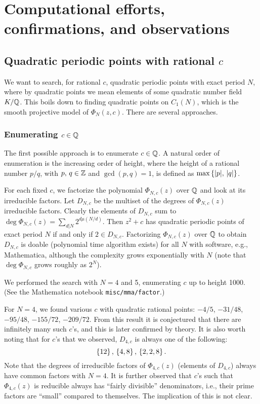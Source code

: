 \section{Computational efforts, confirmations, and observations}

\subsection{Quadratic periodic points with rational $c$}

We want to search, for rational $c$, quadratic periodic points with
exact period $N$, where by quadratic points we mean elements of
some quadratic number field $K/\mathbb{Q}$. This boils down to finding
quadratic points on $C_1(N)$, which is the smooth projective model of
$\Phi_N(z, c)$. There are several approaches.

\subsubsection{Enumerating $c \in \mathbb{Q}$}

The first possible approach is to enumerate $c \in \mathbb{Q}$. A natural
order of enumeration is the increasing order of height, where the
height of a rational number $p/q$, with $p,\, q \in \mathbb{Z}$ and $\gcd(p,
q) = 1$, is defined as $\max\left\{|p|,\, |q|\right\}$.

For each fixed $c$, we factorize the polynomial $\Phi_{N,c}(z)$ over
$\mathbb{Q}$ and look at its irreducible factors. Let $D_{N,c}$ be the
multiset of the degrees of $\Phi_{N,c}(z)$ irreducible
factors. Clearly the elements of $D_{N,c}$ sum to $\deg \Phi_{N,c}(z)
= \sum_{d|N}2^{d \mu(N/d)}$. Then $z^2 + c$ has quadratic periodic
points of exact period $N$ if and only if $2 \in D_{N,c}$. Factorizing
$\Phi_{N,c}(z)$ over $\mathbb{Q}$ to obtain $D_{N,c}$ is doable (polynomial
time algorithm exists) for all $N$ with software, e.g., Mathematica,
although the complexity grows exponentially with $N$ (note that $\deg
\Phi_{N,c}$ grows roughly as $2^N$).

We performed the search with $N = 4$ and 5, enumerating $c$ up to
height 1000. (See the Mathematica notebook \texttt{misc/mma/factor}.)

For $N = 4$, we found various $c$ with quadratic rational points:
$-4/5$, $-31/48$, $-95/48$, $-155/72$, $-209/72$. From this result it
is conjectured that there are infinitely many such $c$'s, and this is
later confirmed by theory. It is also worth noting that for $c$'s that
we observed, $D_{4,c}$ is always one of the following:
\[
\left\{12\right\},\, \left\{4, 8\right\},\, \left\{2, 2, 8\right\}.
\]
Note that the degrees of irreducible factors of $\Phi_{4,c}(z)$
(elements of $D_{4,c}$) always have common factors with $N = 4$. It is
further observed that $c$'s such that $\Phi_{4,c}(z)$ is reducible
always has ``fairly divisible'' denominators, i.e., their prime
factors are ``small'' compared to themselves. The implication of this
is not clear.

